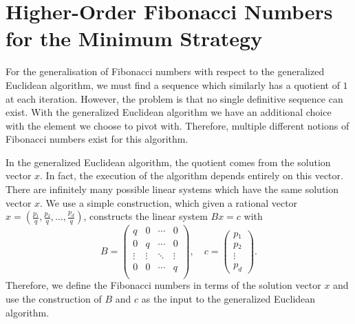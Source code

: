\section{Higher-Order Fibonacci Numbers for the Minimum Strategy}


For the generalisation of Fibonacci numbers with respect to the generalized
Euclidean algorithm,
we must find a sequence which similarly has a quotient of $1$ at each iteration.
However, the problem is that no single definitive sequence can exist.
With the generalized Euclidean algorithm we have an additional choice with the
element we choose to pivot with.
Therefore, multiple different notions of Fibonacci numbers exist for this
algorithm.

In the generalized Euclidean algorithm,
the quotient comes from the solution vector $x$.
In fact, the execution of the algorithm depends entirely on this vector.
There are infinitely many possible linear systems which have the same solution vector $x$.
We use a simple construction, which
given a rational vector $x = \left(\frac{p₁}{q}, \frac{p₂}{q}, …, \frac{p_d}{q}\right)$,
constructs the linear system $Bx = c$ with
\begin{equation}
  \label{eq:linear-system-construction}
  B =
  \begin{pmatrix}
    q & 0 & ⋯ & 0 \\
    0 & q & ⋯ & 0 \\
    ⋮ & ⋮ & ⋱ & ⋮ \\
    0 & 0 & ⋯ & q \\
  \end{pmatrix},
  \quad
  c =
  \begin{pmatrix}
    p₁ \\
    p₂ \\
    ⋮ \\
    p_d
  \end{pmatrix}.
\end{equation}
Therefore, we define the Fibonacci numbers in terms of the solution vector $x$
and use the construction of $B$ and $c$ as the input to the generalized
Euclidean algorithm.

